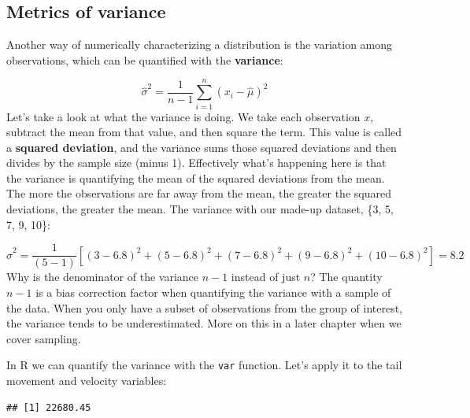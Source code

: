 \documentclass[
]{book}
\newenvironment{Shaded}{\begin{snugshade}}{\end{snugshade}}
\newcommand{\DocumentationTok}[1]{\textcolor[rgb]{0.56,0.35,0.01}{\textbf{\textit{#1}}}}
\newcommand{\FunctionTok}[1]{\textcolor[rgb]{0.13,0.29,0.53}{\textbf{#1}}}
\newcommand{\NormalTok}[1]{#1}
\newcommand{\SpecialCharTok}[1]{\textcolor[rgb]{0.81,0.36,0.00}{\textbf{#1}}}
\begin{document}
\subsection{Metrics of variance}\label{metrics-of-variance}

Another way of numerically characterizing a distribution is the variation among observations, which can be quantified with the \textbf{variance}:

\[
\hat{\sigma}^2 = \frac{1}{n-1} \sum_{i=1}^n (x_i - \hat{\mu})^2
\]
Let's take a look at what the variance is doing. We take each observation \(x\), subtract the mean from that value, and then square the term. This value is called a \textbf{squared deviation}, and the variance sums those squared deviations and then divides by the sample size (minus 1). Effectively what's happening here is that the variance is quantifying the mean of the squared deviations from the mean. The more the observations are far away from the mean, the greater the squared deviations, the greater the mean. The variance with our made-up dataset, \{3, 5, 7, 9, 10\}:

\[
\hat{\sigma}^2 = \frac{1}{(5-1)} \left[ (3 - 6.8)^2 + (5 - 6.8)^2 + (7 - 6.8)^2 + (9 - 6.8)^2 + (10 - 6.8)^2 \right] = 8.2
\]
Why is the denominator of the variance \(n-1\) instead of just \(n\)? The quantity \(n-1\) is a bias correction factor when quantifying the variance with a sample of the data. When you only have a subset of observations from the group of interest, the variance tends to be underestimated. More on this in a later chapter when we cover sampling.

In R we can quantify the variance with the \texttt{var} function. Let's apply it to the tail movement and velocity variables:

\begin{Shaded}
\end{Shaded}

\begin{verbatim}
## [1] 22680.45
\end{verbatim}

\begin{Shaded}
\end{Shaded}
\end{document}
